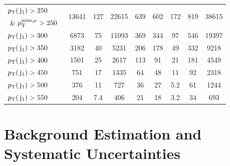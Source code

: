 \begin{table}[htb]
\begin{center}
{\begin{lrbox}{\cutflowBoxa}
\begin{tabular}{l|ccccccc|c}
$p_{\text{T}}(\,\mathrm{j}_1)>250$~\GeV{} 
& \multirow{2}{*}{13641}
& \multirow{2}{*}{127}   
& \multirow{2}{*}{22615}
& \multirow{2}{*}{639}
& \multirow{2}{*}{602}
& \multirow{2}{*}{172}
& \multirow{2}{*}{819}
& \multirow{2}{*}{38615}    \\
               \,\,\& $p^{\rm miss, \mu}_{\rm T}>250$~\GeV{}   &        &           &          &         &         &        &           &           \\
$p_{\text{T}}(\,\mathrm{j}_1)>300$~\GeV{}   &6873    &  75       &11093     & 369     & 344     & 97     &  546      &  19397   \\ 
$p_{\text{T}}(\,\mathrm{j}_1)>350$~\GeV{}   &3182    &  40       &5231      & 206     & 178     & 49     &  332      &  9218    \\ 
$p_{\text{T}}(\,\mathrm{j}_1)>400$~\GeV{}   &1501    &  25       &2617      & 113     & 91      & 21     &  181      &  4549    \\ 
$p_{\text{T}}(\,\mathrm{j}_1)>450$~\GeV{}   &751     &  17       &1335      & 64      & 48      & 11     &  92       &  2318    \\ 
$p_{\text{T}}(\,\mathrm{j}_1)>500$~\GeV{}   &376     &  11       &727       & 36      & 27      & 5.2    &  61       &  1244    \\ 
$p_{\text{T}}(\,\mathrm{j}_1)>550$~\GeV{}   &204     &  7.4      &406       & 21      & 18      & 3.2    &  34       &  693     \\ \hline 
\end{tabular}
\end{lrbox}
\scalebox{0.80}{\usebox{\cutflowBoxa}}} 
\end{center}
\end{table}



\section{Background Estimation and Systematic Uncertainties}
\label{sec:BKG}

